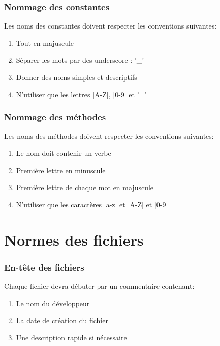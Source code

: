 \documentclass{article}
\begin{document}
\section{Nommage des constantes}

Les noms des constantes doivent respecter les conventions suivantes:

\begin{enumerate}

\item Tout en majuscule
\item Séparer les mots par des underscore : '\_'
\item Donner des noms simples et descriptifs
\item N'utiliser que les lettres [A-Z], [0-9] et '\_'

\end{enumerate}

\section{Nommage des méthodes}

Les noms des méthodes doivent respecter les conventions suivantes: 

\begin{enumerate}
\item Le nom doit contenir un verbe
\item Première lettre en minuscule
\item Première lettre de chaque mot en majuscule
\item N'utiliser que les caractères [a-z] et [A-Z] et [0-9]
\end{enumerate}


\newpage
{}
\part*{Normes des fichiers}
\setcounter{section}{0}
\section{En-tête des fichiers}

Chaque fichier devra débuter par un commentaire contenant:

\begin{enumerate}
\item Le nom du développeur
\item La date de création du fichier
\item Une description rapide si nécessaire
\end{enumerate}
\end{document}
